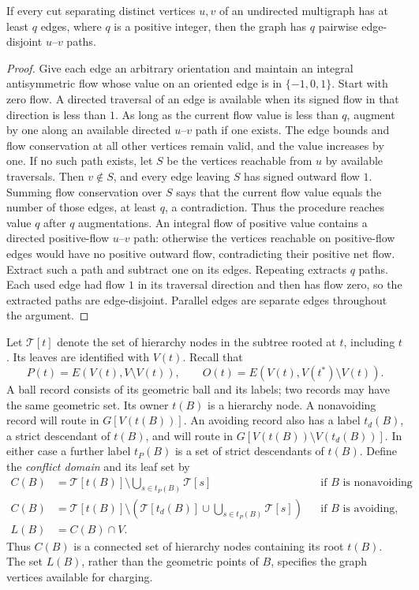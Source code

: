 \begin{lemma}\label{ha:edge-paths}
If every cut separating distinct vertices $u,v$ of an undirected
multigraph has at least $q$ edges, where $q$ is a positive integer,
then the graph has $q$ pairwise edge-disjoint $u$--$v$ paths.
\end{lemma}
\begin{proof}
Give each edge an arbitrary orientation and maintain an integral
antisymmetric flow whose value on an oriented edge is in
$\{-1,0,1\}$.  Start with zero flow.  A directed traversal of an edge
is available when its signed flow in that direction is less than
$1$.  As long as the current flow value is less than $q$, augment
by one along an available directed $u$--$v$ path if one exists.
The edge bounds and flow conservation at all other vertices remain
valid, and the value increases by one.
If no such path exists, let $S$ be the vertices reachable from $u$
by available traversals.  Then $v\notin S$, and every edge leaving
$S$ has signed outward flow $1$.  Summing flow conservation over
$S$ says that the current flow value equals the number of those
edges, at least $q$, a contradiction.  Thus the procedure reaches
value $q$ after $q$ augmentations.
An integral flow of positive value contains a directed positive-flow
$u$--$v$ path: otherwise the vertices reachable on positive-flow
edges would have no positive outward flow, contradicting their
positive net flow.  Extract such a path and subtract one on its
edges.  Repeating extracts $q$ paths.  Each used edge had flow $1$
in its traversal direction and then has flow zero, so the extracted
paths are edge-disjoint.  Parallel edges are separate edges
throughout the argument.
\end{proof}

Let $\mathcal T[t]$ denote the set of hierarchy nodes in the subtree
rooted at $t$, including $t$.  Its leaves are identified with $V(t)$.
Recall that
\[
 P(t)=E(V(t),V\setminus V(t)),\qquad
 O(t)=E(V(t),V(t^*)\setminus V(t)).
\]
A ball record consists of its geometric ball and its labels; two
records may have the same geometric set.  Its owner $t(B)$ is a
hierarchy node.  A nonavoiding record will route in $G[V(t(B))]$.
An avoiding record also has a label $t_d(B)$, a strict descendant of
$t(B)$, and will route in
$G[V(t(B))\setminus V(t_d(B))]$.  In either case a further label
$t_P(B)$ is a set of strict descendants of $t(B)$.  Define the
\emph{conflict domain} and its leaf set by
\begin{align*}
 C(B)&=\mathcal T[t(B)]\setminus
       \bigcup_{s\in t_P(B)}\mathcal T[s]
       &&\text{if $B$ is nonavoiding},\\
 C(B)&=\mathcal T[t(B)]\setminus
       \left(\mathcal T[t_d(B)]\cup
       \bigcup_{s\in t_P(B)}\mathcal T[s]\right)
       &&\text{if $B$ is avoiding},\\
 L(B)&=C(B)\cap V.
\end{align*}
Thus $C(B)$ is a connected set of hierarchy nodes containing its root
$t(B)$.  The set $L(B)$, rather than the geometric points of $B$,
specifies the graph vertices available for charging.

